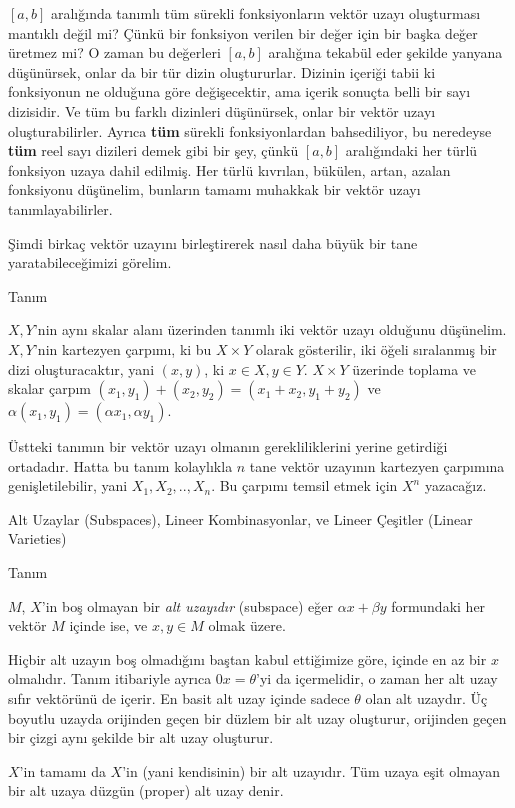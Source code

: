 \documentclass[12pt,fleqn]{article}\usepackage{../../common}
\begin{document}
$[a,b]$ aralığında tanımlı tüm sürekli fonksiyonların vektör uzayı
oluşturması mantıklı değil mi? Çünkü bir fonksiyon verilen bir değer için
bir başka değer üretmez mi? O zaman bu değerleri $[a,b]$ aralığına tekabül
eder şekilde yanyana düşünürsek, onlar da bir tür dizin
oluştururlar. Dizinin içeriği tabii ki fonksiyonun ne olduğuna göre
değişecektir, ama içerik sonuçta belli bir sayı dizisidir. Ve tüm bu farklı
dizinleri düşünürsek, onlar bir vektör uzayı oluşturabilirler. Ayrıca
\textbf{tüm} sürekli fonksiyonlardan bahsediliyor, bu neredeyse
\textbf{tüm} reel sayı dizileri demek gibi bir şey, çünkü $[a,b]$
aralığındaki her türlü fonksiyon uzaya dahil edilmiş. Her türlü kıvrılan,
bükülen, artan, azalan fonksiyonu düşünelim, bunların tamamı muhakkak bir
vektör uzayı tanımlayabilirler.

Şimdi birkaç vektör uzayını birleştirerek nasıl daha büyük bir tane
yaratabileceğimizi görelim. 

Tanım

$X,Y$'nin aynı skalar alanı üzerinden tanımlı iki vektör uzayı olduğunu
düşünelim. $X,Y$'nin kartezyen çarpımı, ki bu $X \times Y$ olarak
gösterilir, iki öğeli sıralanmış bir dizi oluşturacaktır, 
yani $(x,y)$, ki $ x \in X, y \in Y$. $X \times Y$ üzerinde toplama ve
skalar çarpım $(x_1,y_1) + (x_2,y_2) = (x_1+x_2, y_1+y_2)$ ve
$\alpha(x_1,y_1) = (\alpha x_1,\alpha y_1)$. 

Üstteki tanımın bir vektör uzayı olmanın gerekliliklerini yerine getirdiği
ortadadır. Hatta bu tanım kolaylıkla $n$ tane vektör uzayının kartezyen
çarpımına genişletilebilir, yani $X_1,X_2,..,X_n$. Bu çarpımı temsil etmek
için $X^n$ yazacağız. 

Alt Uzaylar (Subspaces), Lineer Kombinasyonlar, ve Lineer Çeşitler (Linear
Varieties)

Tanım 

$M$, $X$'in boş olmayan bir {\em alt uzayıdır} (subspace) eğer
$\alpha x + \beta y$ formundaki her vektör $M$ içinde ise, ve $x,y \in M$
olmak üzere.

Hiçbir alt uzayın boş olmadığını baştan kabul ettiğimize göre, içinde en az
bir $x$ olmalıdır. Tanım itibariyle ayrıca $0 x = \theta$'yi da
içermelidir, o zaman her alt uzay sıfır vektörünü de içerir. En basit alt
uzay içinde sadece $\theta$ olan alt uzaydır. Üç boyutlu uzayda orijinden
geçen bir düzlem bir alt uzay oluşturur, orijinden geçen bir çizgi aynı
şekilde bir alt uzay oluşturur.

$X$'in tamamı da $X$'in (yani kendisinin) bir alt uzayıdır. Tüm uzaya eşit
olmayan bir alt uzaya düzgün (proper) alt uzay denir.
\end{document}
